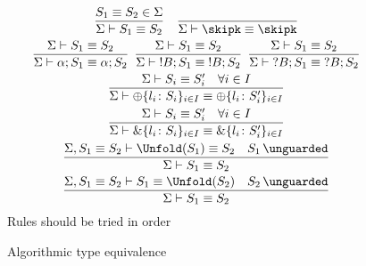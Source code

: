 \begin{figure}[t]
  \begin{gather*}
    \frac{
      S_1 \equiv S_2 \in \Sigma
    }{
      \Sigma \vdash S_1 \equiv S_2
    }
    \quad
    \frac{}{
      \Sigma \vdash \skipk \equiv \skipk
    }
    \\
    \frac{
      \Sigma \vdash S_1 \equiv S_2
    }{
      \Sigma \vdash \alpha;S_1 \equiv \alpha;S_2
    }
    \;\,
    \frac{
      \Sigma \vdash S_1 \equiv S_2
    }{
      \Sigma \vdash \;!B;S_1 \equiv \;!B;S_2
    }
    \;\,
    \frac{
      \Sigma \vdash S_1 \equiv S_2
    }{
      \Sigma \vdash \;?B;S_1 \equiv \;?B;S_2
    }
    \\
    \frac{
      \Sigma \vdash S_i \equiv S_i'
      \quad
      \forall i \in I
    }{
      \Sigma \vdash \oplus\{l_i\colon S_i\}_{i\in I} \equiv \oplus\{l_i\colon S'_i\}_{i\in I} 
    }
    \\
    \frac{
      \Sigma \vdash S_i \equiv S_i'
      \quad
      \forall i \in I
    }{
      \Sigma \vdash \&\{l_i\colon S_i\}_{i\in I} \equiv \&\{l_i\colon S'_i\}_{i\in I} 
    }
    \\
    \frac{
      \Sigma, S_1 \equiv S_2 \vdash \Unfold(S_1) \equiv S_2
      \quad
      S_1\,\unguarded
    }{
      \Sigma \vdash S_1 \equiv S_2
    }
    \\
    \frac{
      \Sigma, S_1 \equiv S_2 \vdash S_1 \equiv \Unfold(S_2)
      \quad
      S_2\,\unguarded
    }{
      \Sigma \vdash S_1 \equiv S_2
    }
  \end{gather*}
  Rules should be tried in order
  \caption{Algorithmic type equivalence}
  \label{fig:alg-type-equiv}
\end{figure}

